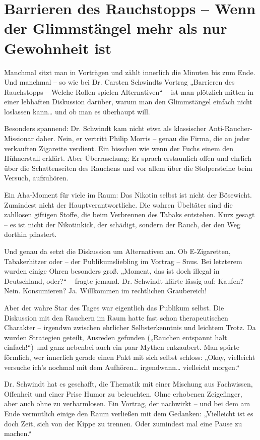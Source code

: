 \section{Barrieren des Rauchstopps – Wenn der Glimmstängel mehr als nur Gewohnheit ist}

\begin{multicols}{2}
Manchmal sitzt man in Vorträgen und zählt
innerlich die Minuten bis zum Ende. Und manchmal – so wie bei Dr. Carsten
Schwindts Vortrag „Barrieren des Rauchstopps – Welche Rollen spielen
Alternativen“ – ist man plötzlich mitten in einer lebhaften Diskussion darüber,
warum man den Glimmstängel einfach nicht loslassen kann… und ob man es
überhaupt will.

Besonders spannend: Dr. Schwindt kam nicht
etwa als klassischer Anti-Raucher-Missionar daher. Nein, er vertritt Philip
Morris – genau die Firma, die an jeder verkauften Zigarette verdient. Ein
bisschen wie wenn der Fuchs einem den Hühnerstall erklärt. Aber Überraschung:
Er sprach erstaunlich offen und ehrlich über die Schattenseiten des Rauchens
und vor allem über die Stolpersteine beim Versuch, aufzuhören.

Ein Aha-Moment für viele im Raum: Das
Nikotin selbst ist nicht der Bösewicht. Zumindest nicht der
Hauptverantwortliche. Die wahren Übeltäter sind die zahllosen giftigen Stoffe,
die beim Verbrennen des Tabaks entstehen. Kurz gesagt – es ist nicht der Nikotinkick,
der schädigt, sondern der Rauch, der den Weg dorthin pflastert.

Und genau da setzt die Diskussion um
Alternativen an. Ob E-Zigaretten, Tabakerhitzer oder – der Publikumsliebling im
Vortrag – Snus. Bei letzterem wurden einige Ohren besonders groß. „Moment, das
ist doch illegal in Deutschland, oder?“ – fragte jemand. Dr. Schwindt klärte
lässig auf: Kaufen? Nein. Konsumieren? Ja. Willkommen im rechtlichen
Graubereich!

Aber der wahre Star des Tages war
eigentlich das Publikum selbst. Die Diskussion mit den Rauchern im Raum hatte
fast schon therapeutischen Charakter – irgendwo zwischen ehrlicher
Selbsterkenntnis und leichtem Trotz. Da wurden Strategien geteilt, Ausreden
gefunden („Rauchen entspannt halt einfach!“) und ganz nebenbei auch ein paar
Mythen entzaubert. Man spürte förmlich, wer innerlich gerade einen Pakt mit
sich selbst schloss: „Okay, vielleicht versuche ich’s nochmal mit dem Aufhören…
irgendwann… vielleicht morgen.“

Dr. Schwindt hat es geschafft, die
Thematik mit einer Mischung aus Fachwissen, Offenheit und einer Prise Humor zu
beleuchten. Ohne erhobenen Zeigefinger, aber auch ohne zu verharmlosen. Ein
Vortrag, der nachwirkt – und bei dem am Ende vermutlich einige den Raum
verließen mit dem Gedanken: „Vielleicht ist es doch Zeit, sich von der Kippe zu
trennen. Oder zumindest mal eine Pause zu machen.“


\end{multicols}
